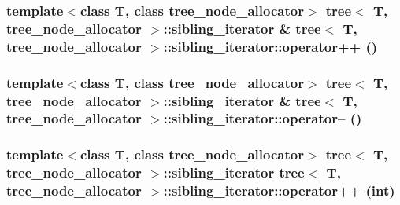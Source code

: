\hypertarget{classtree_1_1sibling__iterator_8d0d647a7843432b5ccc18724fcc3493}{
\subsubsection{\setlength{\rightskip}{0pt plus 5cm}template$<$class T, class tree\_\-node\_\-allocator$>$ {\bf tree}$<$ T, tree\_\-node\_\-allocator $>$::{\bf sibling\_\-iterator} \& {\bf tree}$<$ T, tree\_\-node\_\-allocator $>$::sibling\_\-iterator::operator++ ()}}
\label{classtree_1_1sibling__iterator_8d0d647a7843432b5ccc18724fcc3493}


\hypertarget{classtree_1_1sibling__iterator_7e91377755da77acd20d5b9356f7498e}{
\subsubsection{\setlength{\rightskip}{0pt plus 5cm}template$<$class T, class tree\_\-node\_\-allocator$>$ {\bf tree}$<$ T, tree\_\-node\_\-allocator $>$::{\bf sibling\_\-iterator} \& {\bf tree}$<$ T, tree\_\-node\_\-allocator $>$::sibling\_\-iterator::operator-- ()}}
\label{classtree_1_1sibling__iterator_7e91377755da77acd20d5b9356f7498e}


\hypertarget{classtree_1_1sibling__iterator_66b73e99c5425620a5e282fe23cdfd98}{
\subsubsection{\setlength{\rightskip}{0pt plus 5cm}template$<$class T, class tree\_\-node\_\-allocator$>$ {\bf tree}$<$ T, tree\_\-node\_\-allocator $>$::{\bf sibling\_\-iterator} {\bf tree}$<$ T, tree\_\-node\_\-allocator $>$::sibling\_\-iterator::operator++ (int)}}
\label{classtree_1_1sibling__iterator_66b73e99c5425620a5e282fe23cdfd98}


